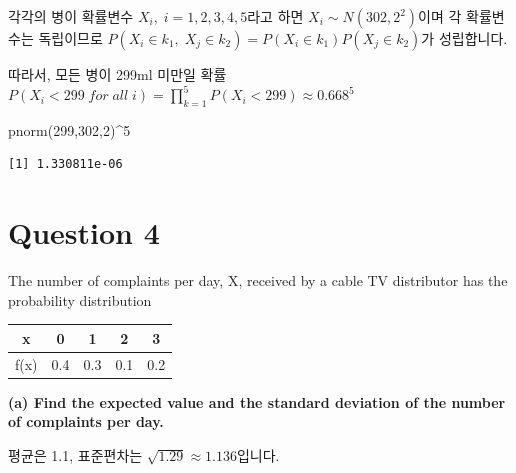 \documentclass[
  a4paper,
  DIV=11,
  numbers=noendperiod]{scrreprt}
\newenvironment{Shaded}{\begin{snugshade}}{\end{snugshade}}
\newcommand{\AttributeTok}[1]{\textcolor[rgb]{0.40,0.45,0.13}{#1}}
\newcommand{\DecValTok}[1]{\textcolor[rgb]{0.68,0.00,0.00}{#1}}
\newcommand{\FloatTok}[1]{\textcolor[rgb]{0.68,0.00,0.00}{#1}}
\newcommand{\FunctionTok}[1]{\textcolor[rgb]{0.28,0.35,0.67}{#1}}
\newcommand{\NormalTok}[1]{\textcolor[rgb]{0.00,0.23,0.31}{#1}}
\newcommand{\OtherTok}[1]{\textcolor[rgb]{0.00,0.23,0.31}{#1}}
\newcommand{\SpecialCharTok}[1]{\textcolor[rgb]{0.37,0.37,0.37}{#1}}
\newcommand{\StringTok}[1]{\textcolor[rgb]{0.13,0.47,0.30}{#1}}
\begin{document}
각각의 병이 확률변수 \(X_i,\;i=1,2,3,4,5\)라고 하면
\(X_i\sim N(302,2^2)\)이며 각 확률변수는 독립이므로
\(P(X_i\in k_1,\;X_j\in k_2)=P(X_i\in k_1)P(X_j\in k_2)\)가 성립합니다.

따라서, 모든 병이 299ml 미만일 확률
\(P(X_i<299\;for\;all\;i)=\prod_{k=1}^5 P(X_i<299)\approx 0.668^5\)

\begin{Shaded}
\begin{Highlighting}[]
\FunctionTok{pnorm}\NormalTok{(}\DecValTok{299}\NormalTok{,}\DecValTok{302}\NormalTok{,}\DecValTok{2}\NormalTok{)}\SpecialCharTok{\^{}}\DecValTok{5}
\end{Highlighting}
\end{Shaded}

\begin{verbatim}
[1] 1.330811e-06
\end{verbatim}

\section*{Question 4}\label{question-4-1}


The number of complaints per day, X, received by a cable TV distributor
has the probability distribution

\begin{longtable}[]{@{}ccccc@{}}
\toprule\noalign{}
x & 0 & 1 & 2 & 3 \\
\midrule\noalign{}
\endhead
\bottomrule\noalign{}
\endlastfoot
f(x) & 0.4 & 0.3 & 0.1 & 0.2 \\
\end{longtable}

\textbf{(a) Find the expected value and the standard deviation of the
number of complaints per day.}

평균은 1.1, 표준편차는 \(\sqrt{1.29}\approx 1.136\)입니다.

\begin{Shaded}
\end{Shaded}
\end{document}
